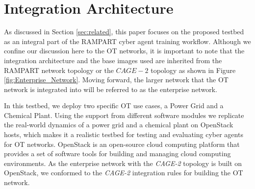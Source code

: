 \section{Integration Architecture}
\label{sec:architecture}
As discussed in Section \ref{sec:related}, this paper focuses on the proposed testbed as an integral part of the RAMPART cyber agent training workflow. Although we confine our discussion here to the OT networks, it is important to note that the integration architecture and the base images used are inherited from the RAMPART network topology or the $CAGE-2$ topology as shown in Figure \ref{fig:Enterprise_Network}. Moving forward, the larger network that the OT network is integrated into will be referred to as the enterprise network.

In this testbed, we deploy two specific OT use cases, a Power Grid and a Chemical Plant. 
Using the support from different software modules we replicate the real-world dynamics of a power grid and a chemical plant on OpenStack hosts, which makes it a realistic testbed for testing and evaluating cyber agents for OT networks. OpenStack is an open-source cloud computing platform that provides a set of software tools for building and managing cloud computing environments.
As the enterprise network with the \textit{CAGE-2} \cite{kiely2023autonomousagentscyberdefence} topology is built on OpenStack, we conformed to the \textit{CAGE-2} integration rules for building the OT network.
